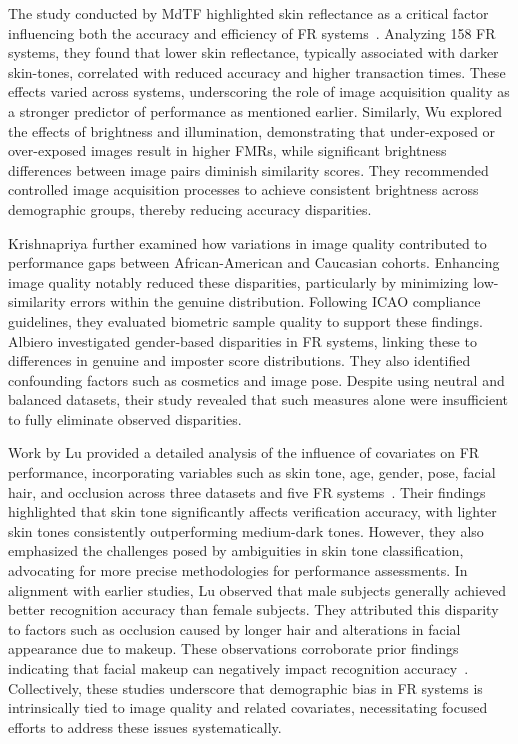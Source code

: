 The study conducted by MdTF highlighted skin reflectance as a critical factor
influencing both the accuracy and efficiency of FR
systems~\cite{cook_tbiom,cook2023demographic}. Analyzing 158 FR systems, they
found that lower skin reflectance, typically associated with darker skin-tones,
correlated with reduced accuracy and higher transaction times. These effects
varied across systems, underscoring the role of image acquisition quality as a
stronger predictor of performance as mentioned earlier. Similarly, Wu \etal
\cite{wu2023face} explored the effects of brightness and illumination,
demonstrating that under-exposed or over-exposed images result in higher FMRs,
while significant brightness differences between image pairs diminish similarity
scores. They recommended controlled image acquisition processes to achieve
consistent brightness across demographic groups, thereby reducing accuracy
disparities.

Krishnapriya \etal \cite{vangara2019characterizing} further examined how
variations in image quality contributed to performance gaps between
African-American and Caucasian cohorts. Enhancing image quality notably reduced
these disparities, particularly by minimizing low-similarity errors within the
genuine distribution. Following ICAO compliance guidelines, they evaluated
biometric sample quality to support these findings. Albiero \etal
\cite{albiero2020analysis} investigated gender-based disparities in FR systems,
linking these to differences in genuine and imposter score distributions. They
also identified confounding factors such as cosmetics and image pose. Despite
using neutral and balanced datasets, their study revealed that such measures
alone were insufficient to fully eliminate observed disparities.

Work by Lu \etal provided a detailed analysis of the influence of covariates on
FR performance, incorporating variables such as skin tone, age, gender, pose,
facial hair, and occlusion across three datasets and five FR
systems~\cite{lu2019experimental}. Their findings highlighted that skin tone
significantly affects verification accuracy, with lighter skin tones
consistently outperforming medium-dark tones. However, they also emphasized the
challenges posed by ambiguities in skin tone classification, advocating for more
precise methodologies for performance assessments. In alignment with earlier
studies, Lu \etal observed that male subjects generally achieved better
recognition accuracy than female subjects. They attributed this disparity to
factors such as occlusion caused by longer hair and alterations in facial
appearance due to makeup. These observations corroborate prior findings
indicating that facial makeup can negatively impact recognition
accuracy~\cite{dantcheva2012can, kotwal2019detection}. Collectively, these
studies underscore that demographic bias in FR systems is intrinsically tied to
image quality and related covariates, necessitating focused efforts to address
these issues systematically.

